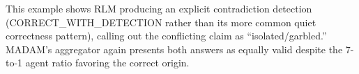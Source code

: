 \documentclass[11pt]{article}
\begin{document}
\noindent This example shows RLM producing an explicit contradiction detection (CORRECT\_WITH\_DETECTION rather than its more common quiet correctness pattern), calling out the conflicting claim as ``isolated/garbled.'' MADAM's aggregator again presents both answers as equally valid despite the 7-to-1 agent ratio favoring the correct origin.
\end{document}
